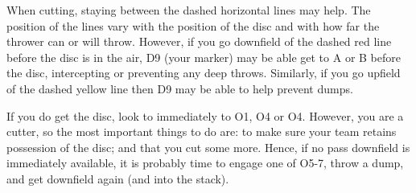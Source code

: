 \documentclass{tufte-handout}
\begin{document}
When cutting,
staying  
between 
the dashed 
horizontal 
lines 
may help. 
The position of 
the lines vary
with the position of the disc
and with how far the thrower  
can or will 
throw. 
However, 
if you go 
downfield of the dashed red line 
before the disc is in the air,
D9 (your marker) 
may be able 
get to
A or B 
before the disc,
intercepting 
or preventing 
any deep throws. 
Similarly, 
if you go 
upfield of the dashed yellow line
then D9 may 
be able to help
prevent dumps.

If you do get the disc,
look to immediately  
to O1, 
O4 
or O4. 
However, 
you are a cutter, 
so the most 
important things to do are:
to make sure your team 
retains possession of the disc; and
that you cut some more. 
Hence, 
if no pass downfield 
is immediately available, 
it is probably time to engage 
one of O5-7, 
throw a dump, 
and get downfield again 
(and into the stack).
\end{document}
